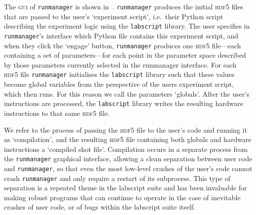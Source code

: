 The \textsc{gui} of \texttt{runmanager} is shown in~. \texttt{runmanager} produces the initial \textsc{hdf5} files that are passed to the user's `experiment script', i.e.~their Python script describing the experiment logic using the \texttt{labscript} library. The user specifies in \texttt{runmanager}'s interface which Python file contains this experiment script, and when they click the `engage' button, \texttt{runmanager} produces one \textsc{hdf5} file---each containing a set of parameters---for each point in the parameter space described by those parameters currently selected in the runmanager interface. For each \textsc{hdf5} file \texttt{runmanager} initialises the \texttt{labscript} library such that these values become global variables from the perspective of the users experiment script, which then runs. For this reason we call the parameters `globals'. After the user's instructions are processed, the \texttt{labscript} library writes the resulting hardware instructions to that same \textsc{hdf5} file.

We refer to the process of passing the \textsc{hdf5} file to the user's code and running it as `compilation', and the resulting \textsc{hdf5} file containing both globals and hardware instructions a `compiled shot file'. Compilation occurs in a separate process from the \texttt{runmanager} graphical interface, allowing a clean separation between user code and \texttt{runmanager}, so that even the most low-level crashes of the user's code cannot crash \texttt{runmanager} and only require a restart of its subprocess. This type of separation is a repeated theme in the labscript suite and has been invaluable for making robust programs that can continue to operate in the case of inevitable crashes of user code, or of bugs within the labscript suite itself.

